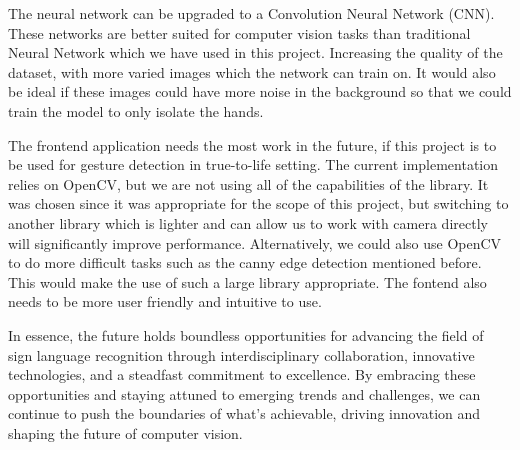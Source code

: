 \documentclass[a4paper,oneside,12pt]{report}
\begin{document}
The neural network can be upgraded to a Convolution Neural Network (CNN). These networks are better suited for computer vision tasks than traditional Neural Network which we have used in this project. Increasing the quality of the dataset, with more varied images which the network can train on. It would also be ideal if these images could have more noise in the background so that we could train the model to only isolate the hands.

The frontend application needs the most work in the future, if this project is to be used for gesture detection in true-to-life setting. The current implementation relies on OpenCV, but we are not using all of the capabilities of the library. It was chosen since it was appropriate for the scope of this project, but switching to another library which is lighter and can allow us to work with camera directly will significantly improve performance. Alternatively, we could also use OpenCV to do more difficult tasks such as the canny edge detection mentioned before. This would make the use of such a large library appropriate. The fontend also needs to be more user friendly and intuitive to use.

In essence, the future holds boundless opportunities for advancing the field of sign language recognition through interdisciplinary collaboration, innovative technologies, and a steadfast commitment to excellence. By embracing these opportunities and staying attuned to emerging trends and challenges, we can continue to push the boundaries of what's achievable, driving innovation and shaping the future of computer vision.


\end{document}

